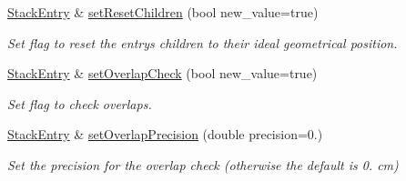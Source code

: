 \begin{DoxyCompactItemize}
\hyperlink{struct_d_d4hep_1_1_alignments_1_1_alignment_stack_1_1_stack_entry}{Stack\+Entry} \& \hyperlink{struct_d_d4hep_1_1_alignments_1_1_alignment_stack_1_1_stack_entry_ad594ba553b888a578b961d11db56c3c9}{set\+Reset\+Children} (bool new\+\_\+value=true)
\begin{DoxyCompactList}\small\item\em Set flag to reset the entry\textquotesingle{}s children to their ideal geometrical position. \end{DoxyCompactList}\item 
\hyperlink{struct_d_d4hep_1_1_alignments_1_1_alignment_stack_1_1_stack_entry}{Stack\+Entry} \& \hyperlink{struct_d_d4hep_1_1_alignments_1_1_alignment_stack_1_1_stack_entry_aab3b64eec3b308f200667f95d1b60a16}{set\+Overlap\+Check} (bool new\+\_\+value=true)
\begin{DoxyCompactList}\small\item\em Set flag to check overlaps. \end{DoxyCompactList}\item 
\hyperlink{struct_d_d4hep_1_1_alignments_1_1_alignment_stack_1_1_stack_entry}{Stack\+Entry} \& \hyperlink{struct_d_d4hep_1_1_alignments_1_1_alignment_stack_1_1_stack_entry_a0b82028a7597f34015a833c6273bd36b}{set\+Overlap\+Precision} (double precision=0.)
\begin{DoxyCompactList}\small\item\em Set the precision for the overlap check (otherwise the default is 0. cm) \end{DoxyCompactList}\end{DoxyCompactItemize}
